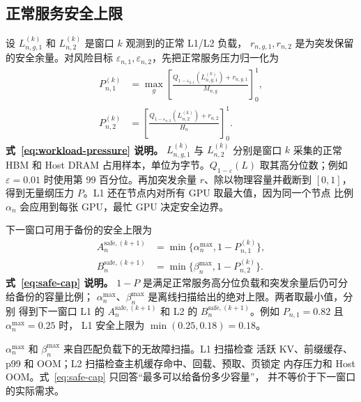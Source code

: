 \documentclass[UTF8,11pt,a4paper,fontset=fandol]{ctexart}
\newcommand{\clip}[1]{\left[#1\right]_0^1}
\begin{document}
\subsection{正常服务安全上限}

设 $L_{n,g,1}^{(k)}$ 和 $L_{n,2}^{(k)}$ 是窗口 $k$ 观测到的正常 L1/L2 负载，
$r_{n,g,1},r_{n,2}$ 是为突发保留的安全余量。对风险目标
$\varepsilon_{n,1},\varepsilon_{n,2}$，先把正常服务压力归一化为
\begin{equation}
  \begin{aligned}
    P_{n,1}^{(k)}
      &=\max_g\clip{
        \frac{Q_{1-\varepsilon_{n,1}}(L_{n,g,1}^{(k)})+r_{n,g,1}}
             {M_{n,g}}},\\
    P_{n,2}^{(k)}
      &=\clip{
        \frac{Q_{1-\varepsilon_{n,2}}(L_{n,2}^{(k)})+r_{n,2}}
             {H_n}}.
  \end{aligned}
  \label{eq:workload-pressure}
\end{equation}
\noindent\textbf{式~\eqref{eq:workload-pressure} 说明。}
$L_{n,g,1}^{(k)}$ 与 $L_{n,2}^{(k)}$ 分别是窗口 $k$ 采集的正常 HBM 和 Host DRAM
占用样本，单位为字节。$Q_{1-\varepsilon}(L)$ 取其高分位数；例如
$\varepsilon=0.01$ 时使用第 99 百分位。再加突发余量 $r$、除以物理容量并截断到
$[0,1]$，得到无量纲压力 $P$。L1 还在节点内对所有 GPU 取最大值，因为同一个节点
比例 $\alpha_n$ 会应用到每张 GPU，最忙 GPU 决定安全边界。

下一窗口可用于备份的安全上限为
\begin{equation}
  \begin{aligned}
    A_n^{\mathrm{safe},(k+1)}
      &=\min\{\alpha_n^{\max},1-P_{n,1}^{(k)}\},\\
    B_n^{\mathrm{safe},(k+1)}
      &=\min\{\beta_n^{\max},1-P_{n,2}^{(k)}\}.
  \end{aligned}
  \label{eq:safe-cap}
\end{equation}
\noindent\textbf{式~\eqref{eq:safe-cap} 说明。}
$1-P$ 是满足正常服务高分位负载和突发余量后仍可分给备份的容量比例；
$\alpha_n^{\max}$、$\beta_n^{\max}$ 是离线扫描给出的绝对上限。两者取最小值，分别
得到下一窗口 L1 的 $A_n^{\mathrm{safe},(k+1)}$ 和 L2 的
$B_n^{\mathrm{safe},(k+1)}$。例如 $P_{n,1}=0.82$ 且 $\alpha_n^{\max}=0.25$ 时，
L1 安全上限为 $\min(0.25,0.18)=0.18$。

$\alpha_n^{\max}$ 和 $\beta_n^{\max}$ 来自匹配负载下的无故障扫描。L1 扫描检查
活跃 KV、前缀缓存、p99 和 OOM；L2 扫描检查主机缓存命中、回载、预取、页锁定
内存压力和 Host OOM。式~\eqref{eq:safe-cap} 只回答“最多可以给备份多少容量”，
并不等价于下一窗口的实际需求。
\end{document}
